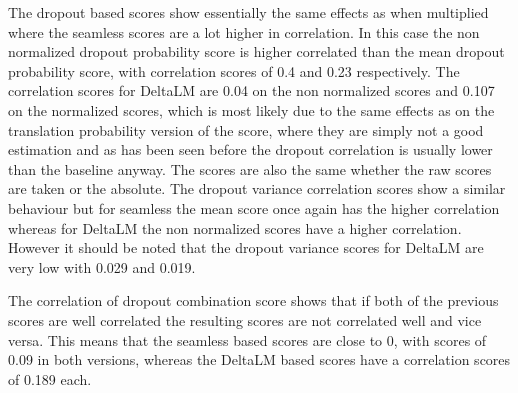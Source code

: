  The dropout based scores show essentially the same effects as when multiplied where the seamless scores are a lot higher in correlation. In this case the non normalized dropout probability score is higher correlated than the mean dropout probability score, with correlation scores of 0.4 and 0.23 respectively. The correlation scores for DeltaLM are 0.04 on the non normalized scores and 0.107 on the normalized scores, which is most likely due to the same effects as on the translation probability version of the score, where they are simply not a good estimation and as has been seen before the dropout correlation is usually lower than the baseline anyway. The scores are also the same whether the raw scores are taken or the absolute. The dropout variance correlation scores show a similar behaviour but for seamless the mean score once again has the higher correlation whereas for DeltaLM the non normalized scores have a higher correlation. However it should be noted that the dropout variance scores for DeltaLM are very low with 0.029 and 0.019. 

 The correlation of dropout combination score shows that if both of the previous scores are well correlated the resulting scores are not correlated well and vice versa. This means that the seamless based scores are close to 0, with scores of 0.09 in both versions, whereas the DeltaLM based scores have a correlation scores of 0.189 each. 

